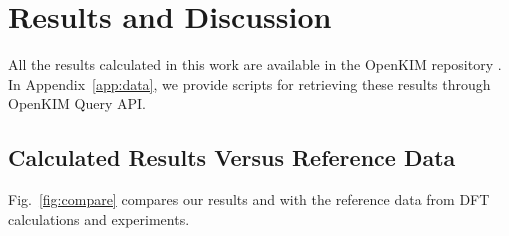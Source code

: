 \documentclass[%
 reprint,
 amsmath,amssymb,
 aps,
]{revtex4-1}
\begin{document}
\section{\label{sec:results}Results and Discussion}

All the results calculated in this work are available in the OpenKIM repository \cite{openkim2016}.
In Appendix~\ref{app:data}, we provide scripts for retrieving these results through OpenKIM Query API.

\subsection{\label{sec:calcvsref}Calculated Results Versus Reference Data}

Fig.~\ref{fig:compare} compares our results and with the reference data from DFT calculations and experiments.
\end{document}
